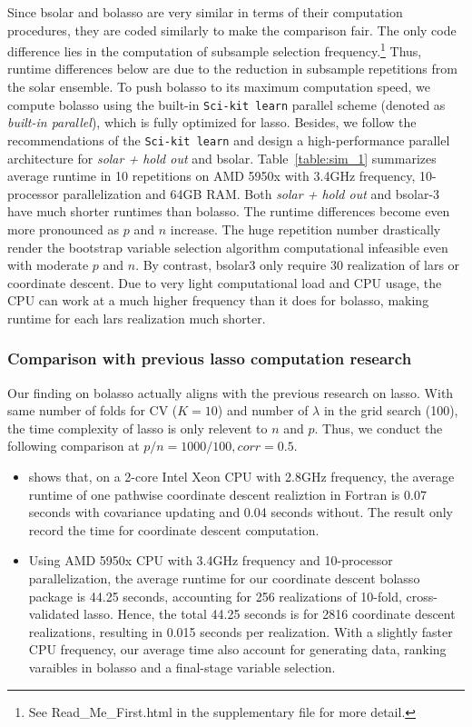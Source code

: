 \documentclass[12pt]{article}
\begin{document}
Since bsolar and bolasso are very similar in terms of their computation procedures, they are coded similarly to make the comparison fair. The only code difference lies in the computation of subsample selection frequency.\footnote{See Read\_Me\_First.html in the supplementary file for more detail.} Thus, runtime differences below are due to the reduction in subsample repetitions from the solar ensemble. To push bolasso to its maximum computation speed, we compute bolasso using the built-in \texttt{Sci-kit learn} parallel scheme (denoted as \emph{built-in parallel}), which is fully optimized for lasso. Besides, we follow the recommendations of the \texttt{Sci-kit learn} and design a high-performance parallel architecture for \emph{solar + hold out} and bsolar. Table~\ref{table:sim_1} summarizes average runtime in 10 repetitions on AMD 5950x with 3.4GHz frequency, 10-processor parallelization and 64GB RAM. Both \emph{solar + hold out} and bsolar-3 have much shorter runtimes than bolasso. The runtime differences become even more pronounced as $p$ and $n$ increase. The huge repetition number drastically render the bootstrap variable selection algorithm computational infeasible even with moderate $p$ and $n$. By contrast, bsolar3 only require 30 realization of lars or coordinate descent. Due to very light computational load and CPU usage, the CPU can work at a much higher frequency than it does for bolasso, making runtime for each lars realization much shorter.

\subsubsection{Comparison with previous lasso computation research}

Our finding on bolasso actually aligns with the previous research on lasso. With same number of folds for CV ($K=10$) and number of $\lambda$ in the grid search (100), the time complexity of lasso is only relevent to $n$ and $p$. Thus, we conduct the following comparison at $p/n=1000/100, corr=0.5$.

\begin{itemize}
  \item \citet[Table 1]{friedman2010regularization} shows that, on a 2-core Intel Xeon CPU with 2.8GHz frequency, the average runtime of one pathwise coordinate descent realiztion in Fortran is 0.07 seconds with covariance updating and 0.04 seconds without. The \citet{friedman2010regularization} result only record the time for coordinate descent computation.
  \item Using AMD 5950x CPU with 3.4GHz frequency and 10-processor parallelization, the average runtime for our coordinate descent bolasso package is 44.25 seconds, accounting for 256 realizations of 10-fold, cross-validated lasso. Hence, the total 44.25 seconds is for 2816 coordinate descent realizations, resulting in 0.015 seconds per realization. With a slightly faster CPU frequency, our average time also account for generating data, ranking varaibles in bolasso and a final-stage variable selection.
\end{itemize}
\end{document}
